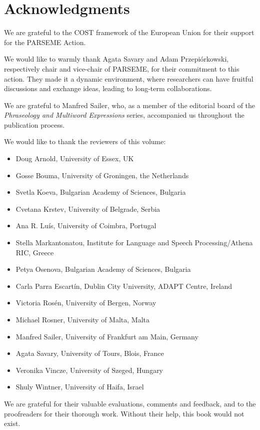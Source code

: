 \documentclass[output=paper]{langsci/langscibook}
\begin{document}
\section{Acknowledgments}
We are grateful to the COST framework of the European Union for their
support for the PARSEME Action.

We would like to warmly thank Agata Savary and Adam Przepiórkowski,
respectively chair and vice-chair of PARSEME, for their commitment to
this action. They made it a dynamic environment, where researchers can
have fruitful discussions and exchange ideas, leading to long-term
collaborations.

We are grateful to Manfred Sailer, who, as a member of the editorial
board of the \emph{Phraseology and Multiword Expressions} series,
accompanied us throughout the publication process.

We would like to thank the reviewers of this volume:
\begin{itemize}
\item Doug Arnold, University of Essex, UK
\item Gosse Bouma, University of Groningen, the Netherlands
\item Svetla Koeva, Bulgarian Academy of Sciences, Bulgaria
\item Cvetana Krstev, University of Belgrade, Serbia
\item Ana R. Lu\'is, University of Coimbra, Portugal 
\item Stella Markantonatou,  Institute for Language and Speech Processing\slash Ath\-ena RIC, Greece
\item Petya Osenova, Bulgarian Academy of Sciences, Bulgaria
\item Carla Parra Escart\'in, Dublin City University, ADAPT Centre, Ireland
\item Victoria Ros\'en, University of Bergen, Norway
\item Michael Rosner, University of Malta, Malta
\item Manfred Sailer, University of Frankfurt am Main, Germany
\item Agata Savary, University of Tours, Blois, France
\item Veronika Vincze, University of Szeged, Hungary
\item Shuly Wintner, University of Haifa, Israel
\end{itemize}

We are grateful for their valuable evaluations, comments and feedback,
and to the proofreaders for their thorough work. Without their help,
this book would not exist.
\end{document}
